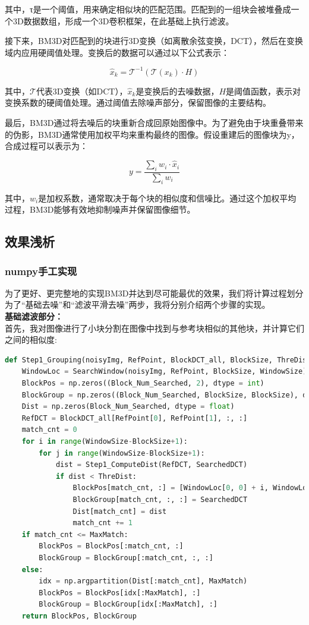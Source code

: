 \documentclass[UTF8]{ctexart}
\begin{document}
其中，τ是一个阈值，用来确定相似块的匹配范围。匹配到的一组块会被堆叠成一个3D数据数组，形成一个3D卷积框架，在此基础上执行滤波。\par
接下来，BM3D对匹配到的块进行3D变换（如离散余弦变换，DCT），然后在变换域内应用硬阈值处理。变换后的数据可以通过以下公式表示：

\[
\hat{x}_k = \mathcal{T}^{-1}(\mathcal{T}(x_k) \cdot H)
\]

其中，$\mathcal{T}$代表3D变换（如DCT），$\hat{x}_k$是变换后的去噪数据，$H$是阈值函数，表示对变换系数的硬阈值处理。通过阈值去除噪声部分，保留图像的主要结构。\par
最后，BM3D通过将去噪后的块重新合成回原始图像中。为了避免由于块重叠带来的伪影，BM3D通常使用加权平均来重构最终的图像。假设重建后的图像块为y，合成过程可以表示为：

\[
y = \frac{\sum_i w_i \cdot \hat{x}_i}{\sum_i w_i}
\]

其中，$w_i$是加权系数，通常取决于每个块的相似度和信噪比。通过这个加权平均过程，BM3D能够有效地抑制噪声并保留图像细节。

\subsection{效果浅析}
\subsubsection{numpy手工实现}
为了更好、更完整地的实现BM3D并达到尽可能最优的效果，我们将计算过程划分为了“基础去噪”和“滤波平滑去噪”两步，我将分别介绍两个步骤的实现。\\
\textbf{基础滤波部分：}\\
首先，我对图像进行了小块分割在图像中找到与参考块相似的其他块，并计算它们之间的相似度:
\begin{lstlisting}[language=Python, caption={图像分块}, label={lst:code5}, mathescape=true, breaklines=true]
def Step1_Grouping(noisyImg, RefPoint, BlockDCT_all, BlockSize, ThreDist, MaxMatch, WindowSize):
    WindowLoc = SearchWindow(noisyImg, RefPoint, BlockSize, WindowSize)
    BlockPos = np.zeros((Block_Num_Searched, 2), dtype = int)
    BlockGroup = np.zeros((Block_Num_Searched, BlockSize, BlockSize), dtype = float)
    Dist = np.zeros(Block_Num_Searched, dtype = float)
    RefDCT = BlockDCT_all[RefPoint[0], RefPoint[1], :, :]
    match_cnt = 0
    for i in range(WindowSize-BlockSize+1):
        for j in range(WindowSize-BlockSize+1):
            dist = Step1_ComputeDist(RefDCT, SearchedDCT)
            if dist < ThreDist:
                BlockPos[match_cnt, :] = [WindowLoc[0, 0] + i, WindowLoc[0, 1] + j]
                BlockGroup[match_cnt, :, :] = SearchedDCT
                Dist[match_cnt] = dist
                match_cnt += 1
    if match_cnt <= MaxMatch:
        BlockPos = BlockPos[:match_cnt, :]
        BlockGroup = BlockGroup[:match_cnt, :, :]
    else:
        idx = np.argpartition(Dist[:match_cnt], MaxMatch)
        BlockPos = BlockPos[idx[:MaxMatch], :]
        BlockGroup = BlockGroup[idx[:MaxMatch], :]
    return BlockPos, BlockGroup
\end{lstlisting}
\end{document}
